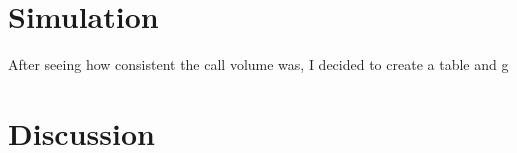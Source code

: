 \documentclass[12pt]{article}
\begin{document}
\section*{Simulation}
After seeing how consistent the call volume was, I decided to create a table and g


\section*{Discussion}




\end{document}
